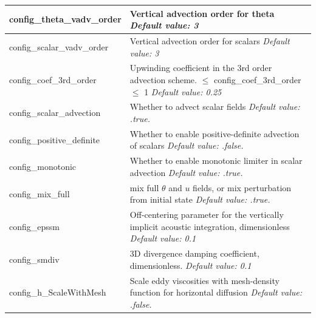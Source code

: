 \documentclass[11pt]{report}
\begin{document}
{\begin{longtable}{|p{1.75in} |p{4.5in}|}
   config\_theta\_vadv\_order & Vertical advection order for theta \newline 
   {\em Default value: 3} \\ \hline

   config\_scalar\_vadv\_order & Vertical advection order for scalars \newline 
   {\em Default value: 3} \\ \hline

   config\_coef\_3rd\_order & Upwinding coefficient in the 3rd order advection scheme. \hfill\break 0 $\le$ config\_coef\_3rd\_order $\le$ 1 \newline 
   {\em Default value: 0.25} \\ \hline
   
   config\_scalar\_advection & Whether to advect scalar fields \newline 
   {\em Default value: .true.} \\ \hline   

   config\_positive\_definite & Whether to enable positive-definite advection of scalars \newline 
   {\em Default value: .false.} \\ \hline

   config\_monotonic & Whether to enable monotonic limiter in scalar advection \newline 
   {\em Default value: .true.} \\ \hline

   config\_mix\_full & mix full $\theta$ and $u$ fields, or mix perturbation from initial state \newline 
   {\em Default value: .true.} \\ \hline   
      
   config\_epssm & Off-centering parameter for the vertically implicit acoustic \hfill \break integration, dimensionless \newline 
   {\em Default value: 0.1} \\ \hline

   config\_smdiv & 3D divergence damping coefficient, dimensionless. \newline 
   {\em Default value: 0.1} \\ \hline

   config\_h\_ScaleWithMesh & Scale eddy viscosities with mesh-density function for horizontal diffusion \newline 
   {\em Default value: .false.} \\ \hline
   

\end{longtable}}
\end{document}
